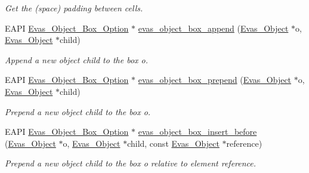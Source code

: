 \begin{DoxyCompactItemize}
\begin{DoxyCompactList}\small\item\em Get the (space) padding between cells. \item\end{DoxyCompactList}\item 
EAPI \hyperlink{group__Evas__Object__Box_gabbeb05bf47aaf7681e9d83a1b0055d20}{Evas\_\-Object\_\-Box\_\-Option} $\ast$ \hyperlink{group__Evas__Object__Box_gaa06e910577a949fc55b3a661d17f2fb3}{evas\_\-object\_\-box\_\-append} (\hyperlink{group__Evas__Object__Group_ga9e19e6dd1f517a0ba437c0114d3e7c97}{Evas\_\-Object} $\ast$o, \hyperlink{group__Evas__Object__Group_ga9e19e6dd1f517a0ba437c0114d3e7c97}{Evas\_\-Object} $\ast$child)
\begin{DoxyCompactList}\small\item\em Append a new object {\itshape child\/} to the box {\itshape o\/}. \item\end{DoxyCompactList}\item 
EAPI \hyperlink{group__Evas__Object__Box_gabbeb05bf47aaf7681e9d83a1b0055d20}{Evas\_\-Object\_\-Box\_\-Option} $\ast$ \hyperlink{group__Evas__Object__Box_ga0fec96faf6bbc106b8af28ff479ddfc3}{evas\_\-object\_\-box\_\-prepend} (\hyperlink{group__Evas__Object__Group_ga9e19e6dd1f517a0ba437c0114d3e7c97}{Evas\_\-Object} $\ast$o, \hyperlink{group__Evas__Object__Group_ga9e19e6dd1f517a0ba437c0114d3e7c97}{Evas\_\-Object} $\ast$child)
\begin{DoxyCompactList}\small\item\em Prepend a new object {\itshape child\/} to the box {\itshape o\/}. \item\end{DoxyCompactList}\item 
EAPI \hyperlink{group__Evas__Object__Box_gabbeb05bf47aaf7681e9d83a1b0055d20}{Evas\_\-Object\_\-Box\_\-Option} $\ast$ \hyperlink{group__Evas__Object__Box_ga5759fa41a7c3541f43ae98f58bd1ec85}{evas\_\-object\_\-box\_\-insert\_\-before} (\hyperlink{group__Evas__Object__Group_ga9e19e6dd1f517a0ba437c0114d3e7c97}{Evas\_\-Object} $\ast$o, \hyperlink{group__Evas__Object__Group_ga9e19e6dd1f517a0ba437c0114d3e7c97}{Evas\_\-Object} $\ast$child, const \hyperlink{group__Evas__Object__Group_ga9e19e6dd1f517a0ba437c0114d3e7c97}{Evas\_\-Object} $\ast$reference)
\begin{DoxyCompactList}\small\item\em Prepend a new object {\itshape child\/} to the box {\ttfamily o} relative to element {\itshape reference\/}. \item\end{DoxyCompactList}\item 

\end{DoxyCompactItemize}
